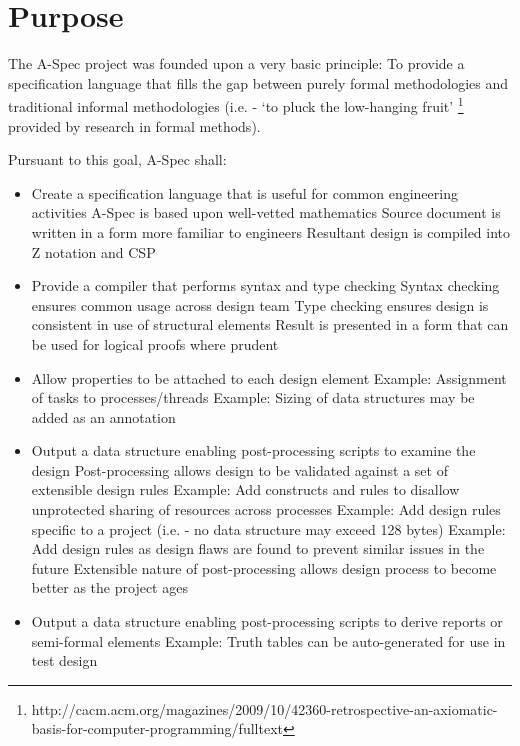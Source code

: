 \documentclass[letterpaper,10pt,draft]{book}
\begin{document}
\section{Purpose}
   \label{sect:Purpose}

The A-Spec project was founded upon a very basic principle: To provide a specification
language that fills the gap between purely formal methodologies and traditional
informal methodologies (i.e. - `to pluck the low-hanging fruit'
\footnote{http://cacm.acm.org/magazines/2009/10/42360-retrospective-an-axiomatic-%
basis-for-computer-programming/fulltext} provided by research in formal methods).

\smallskip
\smallskip
Pursuant to this goal, A-Spec shall:
\begin{itemize}
   \item Create a specification language that is useful for common engineering activities
      \subitem A-Spec is based upon well-vetted mathematics
      \subitem Source document is  written in a form more familiar to engineers
      \subitem Resultant design is compiled into Z notation and CSP
   \item Provide a compiler that performs syntax and type checking
      \subitem Syntax checking ensures common usage across design team
      \subitem Type checking ensures design is consistent in use of structural elements
      \subitem Result is presented in a form that can be used for logical proofs where prudent
   \item Allow properties to be attached to each design element
      \subitem Example: Assignment of tasks to processes/threads
      \subitem Example: Sizing of data structures may be added as an annotation
   \item Output a data structure enabling post-processing scripts to examine the design
      \subitem Post-processing allows design to be validated against a set of extensible design rules
      \subitem Example: Add constructs and rules to disallow unprotected sharing of resources across processes
      \subitem Example: Add design rules specific to a project (i.e. - no data structure may exceed 128 bytes)
      \subitem Example: Add design rules as design flaws are found to prevent similar issues in the future
      \subitem Extensible nature of post-processing allows design process to become better as the project ages
   \item Output a data structure enabling post-processing scripts to derive reports or semi-formal elements
      \subitem Example: Truth tables can be auto-generated for use in test design

\end{itemize}
\end{document}

